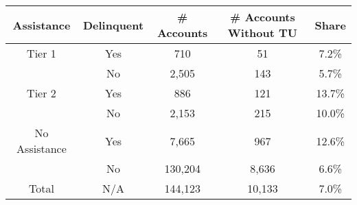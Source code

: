\begin{tabular}{ccccc}
\toprule 
\midrule 
Assistance & Delinquent & \# Accounts & \# Accounts Without TU & Share \\
\midrule 
Tier 1 & Yes & 710 & 51 & 7.2\% \\
 & No & 2,505 & 143 & 5.7\% \\
\midrule 
Tier 2 & Yes & 886 & 121 & 13.7\% \\
 & No & 2,153 & 215 & 10.0\% \\
\midrule 
No Assistance & Yes & 7,665 & 967 & 12.6\% \\
 & No & 130,204 & 8,636 & 6.6\% \\
\midrule 
Total & N/A & 144,123 & 10,133 & 7.0\% \\
\midrule 
\bottomrule 
\end{tabular}
